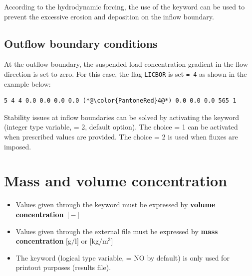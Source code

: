 According to the hydrodynamic forcing, the use of the keyword  can be used to prevent the excessive erosion and deposition on the inflow boundary.

\subsection{Outflow boundary conditions}
At the outflow boundary, the suspended load concentration gradient in the flow direction is set to zero. For this case, the flag \texttt{LICBOR} is set \texttt{= 4} as shown in the example below:

\begin{lstlisting}[frame=trBL]
5 4 4 0.0 0.0 0.0 0.0 (*@\color{PantoneRed}4@*) 0.0 0.0 0.0 565 1
\end{lstlisting}

Stability issues at inflow boundaries can be solved by activating the keyword  (integer type variable, {\ttfamily = 2}, default option). The choice {\ttfamily = 1} can be activated when prescribed values are provided. The choice {\ttfamily = 2} is used when fluxes are imposed.

\section{Mass and volume concentration}
\begin{itemize}
\item Values given through the keyword  must be expressed by \textcolor{black}{\textbf{volume concentration}} $[-]$
\item Values given through the external file must be expressed by {\textbf{mass concentration}} $[$g$/$l$]$ or $[$kg$/$m$^3]$
\item The keyword  (logical type variable, {\ttfamily = NO} by default) is only used for printout purposes (results file).
\end{itemize}

